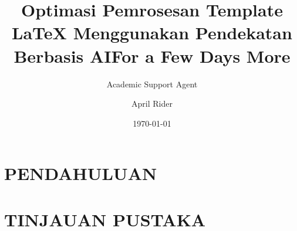 \documentclass{screenplay}
\title{Optimasi Pemrosesan Template LaTeX Menggunakan Pendekatan Berbasis AI}
\author{Academic Support Agent}
\date{\today}
\begin{document}
\maketitle

\begin{abstract}

\end{abstract}

\chapter{PENDAHULUAN}


\chapter{TINJAUAN PUSTAKA}



\title{For a Few Days More}

\author{April Rider}

\address{
555 George St NNW\\
Kaplan, ND 77777\\
999-999-9999}
\end{document}
